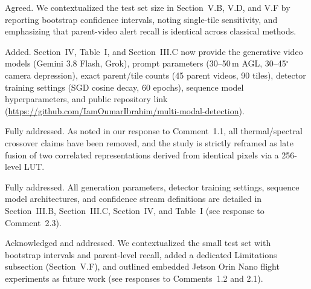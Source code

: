 \documentclass[10pt]{article}
\begin{document}
Agreed. We contextualized the test set size in Section~V.B, V.D, and V.F by reporting bootstrap confidence intervals, noting single-tile sensitivity, and emphasizing that parent-video alert recall is identical across classical methods.

Added. Section~IV, Table~I, and Section~III.C now provide the generative video models (Gemini 3.8 Flash, Grok), prompt parameters (30--50\,m AGL, 30--45$^\circ$ camera depression), exact parent/tile counts (45 parent videos, 90 tiles), detector training settings (SGD cosine decay, 60 epochs), sequence model hyperparameters, and public repository link (\url{https://github.com/IamOumarIbrahim/multi-modal-detection}).


Fully addressed. As noted in our response to Comment~1.1, all thermal/spectral crossover claims have been removed, and the study is strictly reframed as late fusion of two correlated representations derived from identical pixels via a 256-level LUT.

Fully addressed. All generation parameters, detector training settings, sequence model architectures, and confidence stream definitions are detailed in Section~III.B, Section~III.C, Section~IV, and Table~I (see response to Comment~2.3).

Acknowledged and addressed. We contextualized the small test set with bootstrap intervals and parent-level recall, added a dedicated Limitations subsection (Section~V.F), and outlined embedded Jetson Orin Nano flight experiments as future work (see responses to Comments~1.2 and 2.1).
\end{document}
